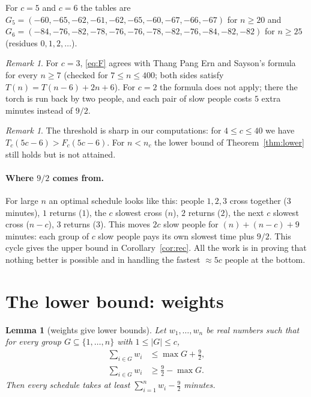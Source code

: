 \documentclass[11pt]{article}
\newtheorem{lemma}[theorem]{Lemma}
\theoremstyle{remark}
\newtheorem{remark}[theorem]{Remark}
\begin{document}
For $c=5$ and $c=6$ the tables are $G_5=(-60,-65,-62,-61,-62,-65,-60,-67,-66,-67)$ for $n\ge20$ and $G_6=(-84,-76,-82,-78,-76,-76,-78,-82,-76,-84,-82,-82)$ for $n\ge25$ (residues $0,1,2,\dots$).

\begin{remark}
For $c=3$, \eqref{eq:F} agrees with Thang Pang Ern and Sayson's formula for every $n\ge7$ (checked for $7\le n\le 400$; both sides satisfy $T(n)=T(n-6)+2n+6$). For $c=2$ the formula does not apply; there the torch is run back by two people, and each pair of slow people costs $5$ extra minutes instead of $9/2$.
\end{remark}

\begin{remark}
The threshold is sharp in our computations: for $4\le c\le 40$ we have $T_c(5c-6)>F_c(5c-6)$. For $n<n_c$ the lower bound of Theorem~\ref{thm:lower} still holds but is not attained.
\end{remark}

\paragraph{Where $9/2$ comes from.} For large $n$ an optimal schedule looks like this: people $1,2,3$ cross together ($3$ minutes), $1$ returns ($1$), the $c$ slowest cross ($n$), $2$ returns ($2$), the next $c$ slowest cross ($n-c$), $3$ returns ($3$). This moves $2c$ slow people for $(n)+(n-c)+9$ minutes: each group of $c$ slow people pays its own slowest time plus $9/2$. This cycle gives the upper bound in Corollary~\ref{cor:rec}. All the work is in proving that nothing better is possible and in handling the fastest $\approx 5c$ people at the bottom.

\section{The lower bound: weights}

\begin{lemma}[weights give lower bounds]\label{lem:dual}
Let $w_1,\dots,w_n$ be real numbers such that for every group $G\subseteq\{1,\dots,n\}$ with $1\le|G|\le c$,
\begin{align}
\textstyle\sum_{i\in G} w_i&\le \max G+\tfrac92, \label{eq:fwd}\\
\textstyle\sum_{i\in G} w_i&\ge \tfrac92-\max G. \label{eq:ret}
\end{align}
Then every schedule takes at least $\sum_{i=1}^n w_i-\frac92$ minutes.
\end{lemma}
\end{document}
